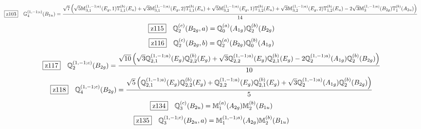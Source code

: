 \documentclass[fleqn,10pt,landscape]{jsarticle}
\begin{document}
\begin{dmath*}
\hspace*{3mm}\fbox{z103}\quad \mathbb{G}_{4}^{(1,-1;c)}(B_{1u})=\frac{\sqrt{7} \left(\sqrt{5} \mathbb{M}_{3,1}^{(1,-1;a)}(E_{g},1) \mathbb{T}_{1,1}^{(b)}(E_{u}) + \sqrt{3} \mathbb{M}_{3,1}^{(1,-1;a)}(E_{g},2) \mathbb{T}_{1,1}^{(b)}(E_{u}) + \sqrt{5} \mathbb{M}_{3,2}^{(1,-1;a)}(E_{g},1) \mathbb{T}_{1,2}^{(b)}(E_{u}) + \sqrt{3} \mathbb{M}_{3,2}^{(1,-1;a)}(E_{g},2) \mathbb{T}_{1,2}^{(b)}(E_{u}) - 2 \sqrt{3} \mathbb{M}_{3}^{(1,-1;a)}(B_{2g}) \mathbb{T}_{1}^{(b)}(A_{2u})\right)}{14}
\end{dmath*}
\begin{dmath*}
\hspace*{3mm}\fbox{z115}\quad \mathbb{Q}_{2}^{(c)}(B_{2g},a)=\mathbb{Q}_{0}^{(a)}(A_{1g}) \mathbb{Q}_{2}^{(b)}(B_{2g})
\end{dmath*}
\begin{dmath*}
\hspace*{3mm}\fbox{z116}\quad \mathbb{Q}_{2}^{(c)}(B_{2g},b)=\mathbb{Q}_{2}^{(a)}(B_{2g}) \mathbb{Q}_{0}^{(b)}(A_{1g})
\end{dmath*}
\begin{dmath*}
\hspace*{3mm}\fbox{z117}\quad \mathbb{Q}_{2}^{(1,-1;c)}(B_{2g})=\frac{\sqrt{10} \left(\sqrt{3} \mathbb{Q}_{2,1}^{(1,-1;a)}(E_{g}) \mathbb{Q}_{2,2}^{(b)}(E_{g}) + \sqrt{3} \mathbb{Q}_{2,2}^{(1,-1;a)}(E_{g}) \mathbb{Q}_{2,1}^{(b)}(E_{g}) - 2 \mathbb{Q}_{2}^{(1,-1;a)}(A_{1g}) \mathbb{Q}_{2}^{(b)}(B_{2g})\right)}{10}
\end{dmath*}
\begin{dmath*}
\hspace*{3mm}\fbox{z118}\quad \mathbb{Q}_{4}^{(1,-1;c)}(B_{2g})=\frac{\sqrt{5} \left(\mathbb{Q}_{2,1}^{(1,-1;a)}(E_{g}) \mathbb{Q}_{2,2}^{(b)}(E_{g}) + \mathbb{Q}_{2,2}^{(1,-1;a)}(E_{g}) \mathbb{Q}_{2,1}^{(b)}(E_{g}) + \sqrt{3} \mathbb{Q}_{2}^{(1,-1;a)}(A_{1g}) \mathbb{Q}_{2}^{(b)}(B_{2g})\right)}{5}
\end{dmath*}
\begin{dmath*}
\hspace*{3mm}\fbox{z134}\quad \mathbb{Q}_{3}^{(c)}(B_{2u})=\mathbb{M}_{1}^{(a)}(A_{2g}) \mathbb{M}_{2}^{(b)}(B_{1u})
\end{dmath*}
\begin{dmath*}
\hspace*{3mm}\fbox{z135}\quad \mathbb{Q}_{3}^{(1,-1;c)}(B_{2u},a)=\mathbb{M}_{1}^{(1,-1;a)}(A_{2g}) \mathbb{M}_{2}^{(b)}(B_{1u})
\end{dmath*}
\end{document}
